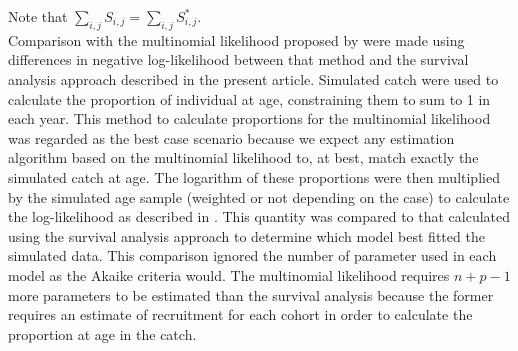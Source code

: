 Note that $\sum_{i,j} S_{i,j} = \sum_{i,j} S^{*}_{i,j}$.\\


Comparison with the multinomial likelihood proposed by \cite{Four82a} were made using differences in negative log-likelihood between that method and the survival analysis approach described in the present article. Simulated catch were used to calculate the proportion of individual at age, constraining them to sum to 1 in each year. This method to calculate proportions for the multinomial likelihood was regarded as the best case scenario because we expect any estimation algorithm based on the multinomial likelihood to, at best, match exactly the simulated catch at age. The logarithm of these proportions were then multiplied by the simulated age sample (weighted or not depending on the case) to calculate the log-likelihood as described in \cite{Four82a}. This quantity was compared to that calculated using the survival analysis approach to determine which model best fitted the simulated data. This comparison ignored the number of parameter used in each model as the Akaike criteria would. The multinomial likelihood requires $n+p-1$ more parameters to be estimated than the survival analysis because the former requires an estimate of recruitment for each cohort in order to calculate the proportion at age in the catch.
